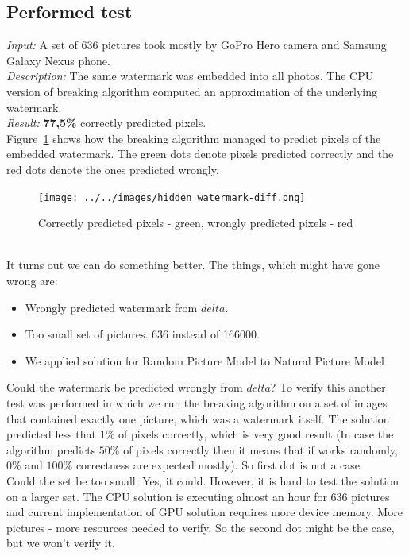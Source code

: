 \documentclass[a4paper,12pt]{article}
\begin{document}
\subsection{Performed test}

\textit{Input:} A set of $636$ pictures took mostly by GoPro Hero camera and
Samsung Galaxy Nexus phone.\\
\textit{Description:} The same watermark was embedded into all photos. The CPU
version of breaking algorithm computed an approximation of the underlying
watermark.\\
\textit{Result:} \textbf{77,5\%} correctly predicted pixels.\\
Figure~\ref{fig:red-green-pixels} shows how the breaking algorithm managed to
predict pixels of the embedded watermark. The green dots denote pixels predicted
correctly and the red dots denote the ones predicted wrongly.
\begin{figure}[ht]
  \centering
    \texttt{[image: ../../images/hidden\_watermark-diff.png]}
  \caption{Correctly predicted pixels - green, wrongly predicted pixels - red}
  \label{fig:red-green-pixels}
\end{figure}\\
It turns out we can do something better. The things, which might have gone wrong are:
\begin{itemize}
  \item Wrongly predicted watermark from $delta$.
  \item Too small set of pictures. 636 instead of 166000.
  \item We applied solution for Random Picture Model to Natural Picture Model
\end{itemize}
Could the watermark be predicted wrongly from $delta$? To verify this another
test was performed in which we run the breaking algorithm on a set of
images that contained exactly one picture, which was a watermark itself.
The solution predicted less that $1$\% of pixels correctly, which is very good
result (In case the algorithm predicts $50$\% of pixels correctly then it
means that if works randomly, $0$\% and $100$\% correctness are expected
mostly). So first dot is not a case.\\
Could the set be too small. Yes, it could. However, it is hard to test the
solution on a larger set. The CPU solution is executing almost an hour for $636$
pictures and current implementation of GPU solution requires more device memory.
More pictures - more resources needed to verify. So the second dot might be the
case, but we won't verify it.
\end{document}
